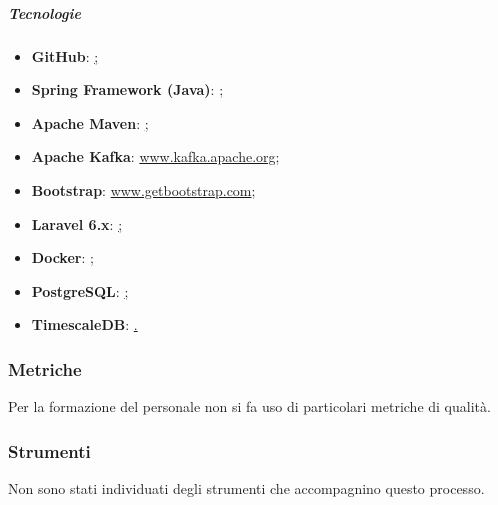 		\subparagraph{Tecnologie}
		\begin{itemize}
			\item \textbf{GitHub}: \href{https://guides.github.com};
			\item \textbf{Spring Framework (Java)}: \href{https://spring.io/guides/gs/rest-service};
			\item \textbf{Apache Maven}: \href{https://maven.apache.org/guides/getting-started};
			\item \textbf{Apache Kafka}: \href{https://kafka.apache.org/}{www.kafka.apache.org};
			\item \textbf{Bootstrap}: \href{https://getbootstrap.com/}{www.getbootstrap.com};
			\item \textbf{Laravel 6.x}: \href{https://laravel.com/docs/6.x};
			\item \textbf{Docker}: \href{https://docs.docker.com/get-started};
			\item \textbf{PostgreSQL}: \href{https://www.postgresql.org/docs/12}; 
			\item \textbf{TimescaleDB}: \href{https://docs.timescale.com/latest/getting-started}.
		\end{itemize}


	\subsubsection{Metriche}
		Per la formazione del personale non si fa uso di particolari metriche di qualità.

	\subsubsection{Strumenti}
		Non sono stati individuati degli strumenti che accompagnino questo processo.